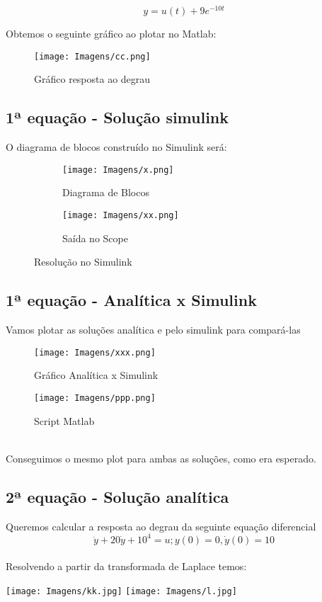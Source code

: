 \documentclass[a4paper, 12pt]{article}
\begin{document}
	\begin{equation}
		y = u(t) + 9e^{-10t}
	\end{equation}		
		
		
	Obtemos o seguinte gráfico ao plotar no Matlab:
	\begin{figure}[h]
		\center
		\texttt{[image: Imagens/cc.png]}
		\caption{Gráfico resposta ao degrau}
	\end{figure}
	
	
	\newpage
\subsection{1ª equação - Solução simulink}
	O diagrama de blocos construído no Simulink será:
	\begin{figure}[h]
	\centering
		\begin{subfigure}{.5\textwidth}
  			\centering
 			\texttt{[image: Imagens/x.png]}
  			\caption{Diagrama de Blocos}
		\end{subfigure}%
		\begin{subfigure}{.5\textwidth}
  			\centering
  			\texttt{[image: Imagens/xx.png]}
  			\caption{Saída no Scope}
		\end{subfigure}
			\caption{Resolução no Simulink}
	\end{figure}
	
\newpage
\subsection{1ª equação - Analítica x Simulink}
	Vamos plotar as soluções analítica e pelo simulink para compará-las
	\begin{figure}[h]
		\centering
		\texttt{[image: Imagens/xxx.png]}
		\caption{Gráfico Analítica x Simulink}
	\end{figure}
	\begin{figure}[h]
		\centering
		\texttt{[image: Imagens/ppp.png]}
		\caption{Script Matlab}
	\end{figure}
	\\Conseguimos o mesmo plot para ambas as soluções, como era esperado.
	




\newpage
\subsection{2ª equação - Solução analítica}
Queremos calcular a resposta ao degrau da seguinte equação diferencial
	\begin{equation}
		\ddot{y} + 20\dot{y} + 10^4 = u; y(0) = 0, \dot{y}(0) = 10
	\end{equation}
	\\Resolvendo a partir da transformada de Laplace temos:
		\begin{center}
			\texttt{[image: Imagens/kk.jpg]}
			\texttt{[image: Imagens/l.jpg]}
		\end{center}
		
\end{document}
